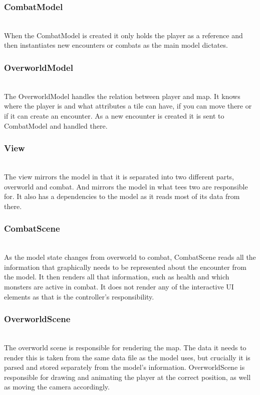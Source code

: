 \subsubsection{CombatModel}
\label{combatmodel}
\\
When the CombatModel is created it only holds the player as a reference and then instantiates new encounters or combats as the main model dictates.

\subsubsection{OverworldModel}
\label{overworldmodel}
\\
The OverworldModel handles the relation between player and map. It knows where the player is and what attributes a tile can have, if you can move there or if it can create an encounter. As a new encounter is created it is sent to CombatModel and handled there.

\subsubsection{View}
\label{view}
\\
The view mirrors the model in that it is separated into two different parts, overworld and combat. And mirrors the model in what tees two are responsible for. It also has a dependencies to the model as it reads most of its data from there.

\subsubsection{CombatScene}
\label{combatscene}
\\
As the model state changes from overworld to combat, CombatScene reads all the information that graphically needs to be represented about the encounter from the model. It then renders all that information, such as health and which monsters are active in combat. It does not render any of the interactive UI elements as that is the controller's responsibility.

\subsubsection{OverworldScene}
\label{overworldscene}
\\
The overworld scene is responsible for rendering the map. The data it needs to render this is taken from the same data file as the model uses, but crucially it is parsed and stored separately from the model's information. OverworldScene is responsible for drawing and animating the player at the correct position, as well as moving the camera accordingly.


